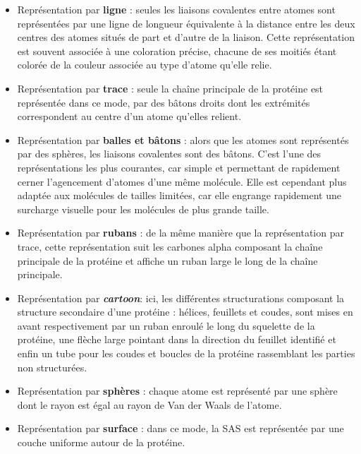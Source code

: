 \begin{itemize}
  \item Représentation par \textbf{ligne} : seules les liaisons covalentes entre atomes sont représentées par une ligne de longueur équivalente à la distance entre les deux centres des atomes situés de part et d'autre de la liaison. Cette représentation est souvent associée à une coloration précise, chacune de ses moitiés étant colorée de la couleur associée au type d'atome qu'elle relie.
  \item Représentation par \textbf{trace} : seule la chaîne principale de la protéine est représentée dans ce mode, par des bâtons droits dont les extrémités correspondent au centre d'un atome qu'elles relient.
  \item Représentation par \textbf{balles et bâtons} : alors que les atomes sont représentés par des sphères, les liaisons covalentes sont des bâtons. C'est l'une des représentations les plus courantes, car simple et permettant de rapidement cerner l'agencement d'atomes d'une même molécule. Elle est cependant plus adaptée aux molécules de tailles limitées, car elle engrange rapidement une surcharge visuelle pour les molécules de plus grande taille.
  \item Représentation par \textbf{rubans} : de la même manière que la représentation par trace, cette représentation suit les carbones alpha composant la chaîne principale de la protéine et affiche un ruban large le long de la chaîne principale.
  \item Représentation par \textit{\textbf{cartoon}}: ici, les différentes structurations composant la structure secondaire d'une protéine : hélices, feuillets et coudes, sont mises en avant respectivement par un ruban enroulé le long du squelette de la protéine, une flèche large pointant dans la direction du feuillet identifié et enfin un tube pour les coudes et boucles de la protéine rassemblant les parties non structurées.
  \item Représentation par \textbf{sphères} : chaque atome est représenté par une sphère dont le rayon est égal au rayon de Van der Waals de l'atome.
  \item Représentation par \textbf{surface} : dans ce mode, la SAS est représentée par une couche uniforme autour de la protéine.
\end{itemize}

